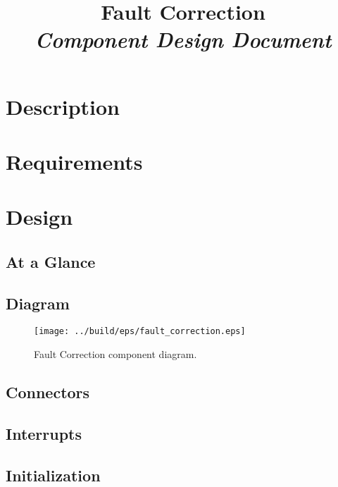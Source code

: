 



\title{\textbf{Fault Correction} \\
\large\textit{Component Design Document}}
\date{}
\maketitle

\section{Description}


\section{Requirements}


\section{Design}

\subsection{At a Glance}


\subsection{Diagram}
\begin{figure}[H]
  \texttt{[image: ../build/eps/fault\_correction.eps]}
  \caption{Fault Correction component diagram.}
\end{figure}

\subsection{Connectors}


\subsection{Interrupts}



\subsection{Initialization}


